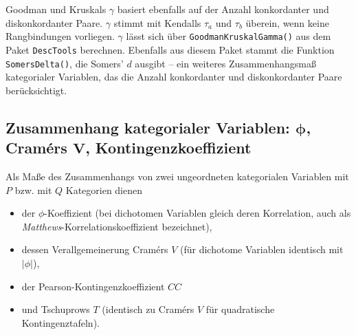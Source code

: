 Goodman und Kruskals $\gamma$ basiert ebenfalls auf der Anzahl konkordanter und diskonkordanter Paare. $\gamma$ stimmt mit Kendalls $\tau_{a}$ und $\tau_{b}$ überein, wenn keine Rangbindungen vorliegen. $\gamma$ lässt sich über \lstinline!GoodmanKruskalGamma()! aus dem Paket \lstinline!DescTools! berechnen. Ebenfalls aus diesem Paket stammt die Funktion \lstinline!SomersDelta()!, die Somers' $d$ ausgibt -- ein weiteres Zusammenhangsmaß kategorialer Variablen, das die Anzahl konkordanter und diskonkordanter Paare berücksichtigt.

\subsection[Zusammenhang kategorialer Variablen]{Zusammenhang kategorialer Variablen: $\bm{\phi}$, Cramérs $\bm{V}$, Kontingenzkoeffizient}
\label{sec:assocMisc}

Als Maße des Zusammenhangs von zwei ungeordneten kategorialen Variablen mit $P$ bzw. mit $Q$ Kategorien dienen
\begin{itemize}
\item der $\phi$-Koeffizient (bei dichotomen Variablen gleich deren Korrelation, auch als \emph{Matthews}-Korrelationskoeffizient bezeichnet),
\item dessen Verallgemeinerung Cramérs $V$ (für dichotome Variablen identisch mit $|\phi|$),
\item der Pearson-Kontingenzkoeffizient $CC$
\item und Tschuprows $T$ (identisch zu Cramérs $V$ für quadratische Kontingenztafeln).
\end{itemize}

